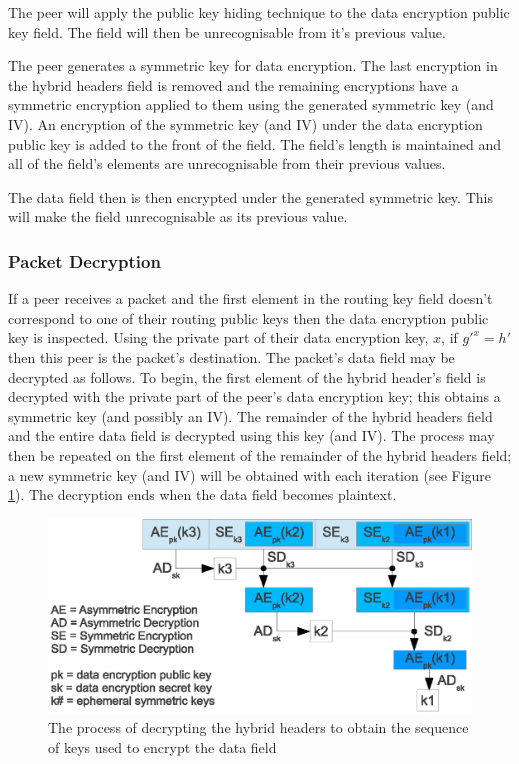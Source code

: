 \documentclass[ %
                    author={Luke Murray},
                supervisor={Dr. Simon Hollis},
                     title={Shadow Peer-to-Peer Networks},
                  subtitle={},
                    degree={MEng},
                      year={2013} ]{thesis}
\begin{document}
The peer will apply the public key hiding technique to the data encryption public key field. The field will then be unrecognisable from it's previous value.

The peer generates a symmetric key for data encryption. The last encryption in the hybrid headers field is removed and the remaining encryptions have a symmetric encryption applied to them using the generated symmetric key (and IV). An encryption of the symmetric key (and IV) under the data encryption public key is added to the front of the field. The field's length is maintained and all of the field's elements are unrecognisable from their previous values.

The data field then is then encrypted under the generated symmetric key. This will make the field unrecognisable as its previous value.

\subsubsection{Packet Decryption}

If a peer receives a packet and the first element in the routing key field doesn't correspond to one of their routing public keys then the data encryption public key is inspected. Using the private part of their data encryption key, $x$, if $g\prime^{x} = h\prime$ then this peer is the packet's destination. The packet's data field may be decrypted as follows. To begin, the first element of the hybrid header's field is decrypted with the private part of the peer's data encryption key; this obtains a symmetric key (and possibly an IV). The remainder of the hybrid headers field and the entire data field is decrypted using this key (and IV). The process may then be repeated on the first element of the remainder of the hybrid headers field; a new symmetric key (and IV) will be obtained with each iteration (see Figure \ref{hybrid_decrypt}). The decryption ends when the data field becomes plaintext.

\begin{figure}[h]
    \centering
    \includegraphics{diagrams/hybrid_header_decryption2.eps}
    \caption{The process of decrypting the hybrid headers to obtain the sequence of keys used to encrypt the data field}
    \label{hybrid_decrypt}
\end{figure}
\end{document}
